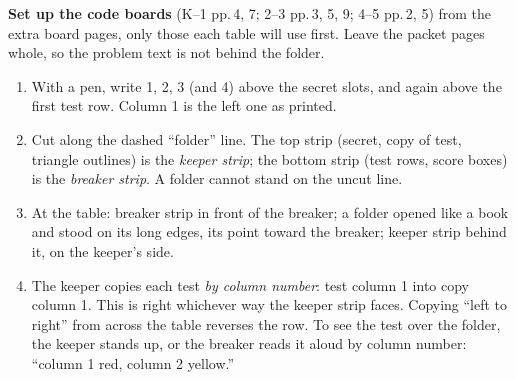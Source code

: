\documentclass[11pt]{article}
\begin{document}
\medskip
\begin{minipage}[t]{0.60\linewidth}
\textbf{Set up the code boards} (K--1 pp.\,4, 7; 2--3 pp.\,3, 5, 9; 4--5 pp.\,2, 5) from the extra board pages, only those each table will use first. Leave the packet pages whole, so the problem text is not behind the folder.
\begin{enumerate}
\item With a pen, write 1, 2, 3 (and 4) above the secret slots, and again above the first test row. Column 1 is the left one as printed.
\item Cut along the dashed ``folder'' line. The top strip (secret, copy of test, triangle outlines) is the \emph{keeper strip}; the bottom strip (test rows, score boxes) is the \emph{breaker strip}. A folder cannot stand on the uncut line.
\item At the table: breaker strip in front of the breaker; a folder opened like a book and stood on its long edges, its point toward the breaker; keeper strip behind it, on the keeper's side.
\item The keeper copies each test \emph{by column number}: test column 1 into copy column 1. This is right whichever way the keeper strip faces. Copying ``left to right'' from across the table reverses the row. To see the test over the folder, the keeper stands up, or the breaker reads it aloud by column number: ``column 1 red, column 2 yellow.''
\end{enumerate}
\end{minipage}\hfill
\begin{minipage}[t]{0.36\linewidth}
\vspace{2pt}
\end{minipage}
\end{document}
